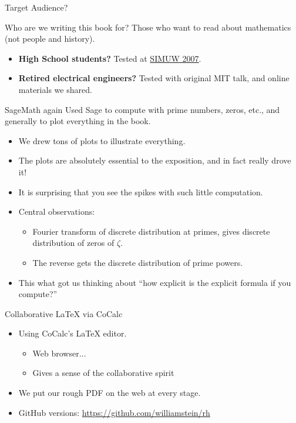 \documentclass{beamer}
\begin{document}
\begin{frame}{Target Audience?}

  Who are we writing this book for? Those who want to read about mathematics (not people and history).

  \begin{itemize}
    \item \textbf{High School students?} Tested at \href{https://wstein.org/edu/2007/simuw07/}{SIMUW 2007}.
    \item \textbf{Retired electrical engineers?}  Tested with original MIT talk, and  online materials we shared.
  \end{itemize}


\end{frame}


\begin{frame}{SageMath again}
  Used Sage to compute with prime numbers, zeros, etc., and generally to plot everything in the book.
  \begin{itemize}
    \item We drew tons of plots to illustrate everything.
    \item The plots are absolutely essential to the exposition, and in fact really drove it!
    \item It is surprising that you see the spikes with such little computation.
    \item Central observations:
          \begin{itemize}
            \item Fourier transform of discrete distribution at primes, gives discrete distribution of zeros of $\zeta$.
            \item The reverse gets the discrete distribution of prime powers.
          \end{itemize}
    \item This what got us thinking about ``how explicit is the explicit formula if you compute?''
  \end{itemize}
\end{frame}


\begin{frame}{Collaborative \LaTeX{} via CoCalc}
  \begin{itemize}
    \item Using CoCalc's \LaTeX{} editor.
          \begin{itemize}
            \item Web browser...
            \item Gives a sense of the collaborative spirit
          \end{itemize}
    \item We put our rough PDF on the web at every stage.
    \item GitHub versions: \url{https://github.com/williamstein/rh}
  \end{itemize}
\end{frame}
\end{document}

